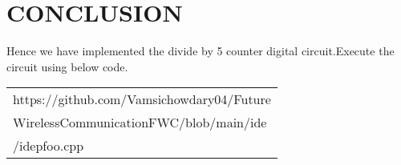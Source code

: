 \documentclass[journal,12pt,twocolumn]{IEEEtran}
\begin{document}
    \section{CONCLUSION}
    Hence we have implemented the divide by 5 counter digital circuit.Execute the circuit using below code.
    \begin{tabularx}{0.46\textwidth} { 
  | >{\centering\arraybackslash}X |}
  \hline
   https://github.com/Vamsichowdary04/Future\\\-Wireless\-Communication\-FWC\-/blob/main/ide\\/idepfoo.cpp\\
  \hline
\end{tabularx}


 
\end{document}
